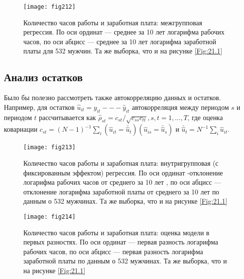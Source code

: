  \begin{figure}[ht]
                \begin{center}
                    \texttt{[image: fig212]}
                    \caption{Количество часов работы и заработная плата: межгрупповая регрессия. По оси ординат --- среднее за 10 лет логарифма рабочих часов, по оси абцисс --- среднее за 10 лет логарифма заработной платы для 532 мужчин. Та же выборка, что и на рисунке \ref{Fig:21.1}}
                    \label{Fig:21.2}
                \end{center}
     \end{figure}

\subsection{Анализ остатков}

Было бы полезно рассмотреть также автокорреляцию данных и остатков. Например, для остатков $\hat{u}_{it}=y_{it} --- \hat{y}_{it}$ автокорреляция между периодом $s$ и периодом $t$ рассчитывается как $\hat{\rho}_{st} = c_{st}/\sqrt{c_{ss} c_{tt}}, s, t = 1, \dots, T$, где оценка ковариации  $c_{st}=(N-1)^{-1} \sum_i (\hat{u}_{it} = \bar{\hat{u}}_t)(\hat{u}_{is} = \bar{\hat{u}}_s)$ и $\bar{\hat{u}}_t= N^{-1} \sum_i \hat{u}_{it}$.

 \begin{figure}[ht]
                \begin{center}
                    \texttt{[image: fig213]}
                    \caption{Количество часов работы и заработная плата: внутригрупповая (с фиксированным эффектом) регрессия. По оси ординат -отклонение логарифма рабочих часов от среднего за 10 лет , по оси абцисс --- отклонение логарифма заработной платы от среднего за 10 лет  по данным о 532 мужчинах. Та же выборка, что и на рисунке \ref{Fig:21.1}}
                    \label{Fig:21.3}
                \end{center}
     \end{figure}

 \begin{figure}[ht]
                \begin{center}
                    \texttt{[image: fig214]}
                    \caption{Количество часов работы и заработная плата: оценка модели в первых разностях. По оси ординат --- первая разность логарифма рабочих часов, по оси абцисс --- первая разность логарифма заработной платы по данным о 532 мужчинах. Та же выборка, что и на рисунке \ref{Fig:21.1}}
                    \label{Fig:21.4}
                \end{center}
     \end{figure}


